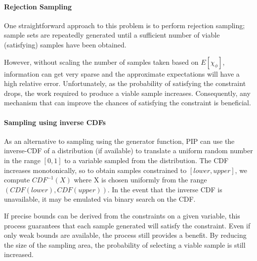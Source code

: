 \paragraph{Rejection Sampling}
One straightforward approach to this problem is to perform rejection sampling; sample sets are repeatedly generated until a sufficient number of viable (satisfying) samples have been obtained.  %

However, without scaling the number of samples taken based on $E[\chi_\phi]$, information can get very sparse and the approximate expectations will have a high relative error.  Unfortunately, as the probability of satisfying the constraint drops, the work required to produce a viable sample increases.   Consequently, any mechanism that can improve the chances of satisfying the constraint is beneficial.

\paragraph{Sampling using inverse CDFs}
\label{subsec:icdf}
As an alternative to sampling using the generator function, PIP can use the inverse-CDF of a distribution (if available) to translate a uniform random number in the range $[0,1]$ to a variable sampled from the distribution.  The CDF increases monotonically, so to obtain samples constrained to $[lower, upper]$, we compute $CDF^{-1}(X)$ where X is chosen uniformly  from the range $(CDF(lower), CDF(upper))$.  In the event that the inverse CDF is unavailable, it may be emulated via binary search on the CDF.


If precise bounds can be derived from the constraints on a given variable, this process guarantees that each sample generated will satisfy the constraint.  Even if only weak bounds are available, the process still provides a benefit.  By reducing the size of the sampling area, the probability of selecting a viable sample is still increased.  

